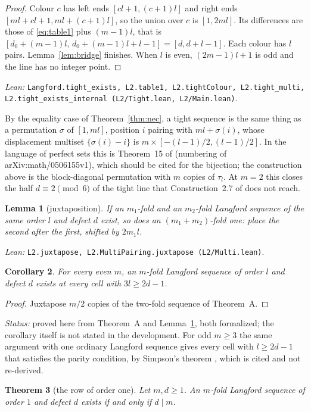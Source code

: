 \documentclass[11pt]{amsart}
\theoremstyle{plain}
\newtheorem{theorem}{Theorem}[section]
\newtheorem{lemma}[theorem]{Lemma}
\newtheorem{corollary}[theorem]{Corollary}
\theoremstyle{definition}
\theoremstyle{remark}
\newcommand{\lean}[1]{\par\smallskip
  {\small\raggedright\noindent\textit{Lean:} \texttt{#1}.\par}\smallskip}
\newcommand{\status}[1]{\par\smallskip
  {\small\raggedright\noindent\textit{Status:} #1\par}\smallskip}
\begin{document}
\begin{proof}
Colour $c$ has left ends $[cl+1,(c+1)l]$ and right ends $[ml+cl+1,ml+(c+1)l]$, so the
union over $c$ is $[1,2ml]$. Its differences are those of \eqref{eq:table1} plus
$(m-1)l$, that is $[d_0+(m-1)l,\, d_0+(m-1)l+l-1] = [d,d+l-1]$. Each colour has $l$
pairs. Lemma~\ref{lem:bridge} finishes. When $l$ is even, $(2m-1)l+1$ is odd and the line
has no integer point.
\end{proof}
\lean{Langford.tight\_exists, L2.table1, L2.tightColour, L2.tight\_multi,
L2.tight\_exists\_internal (L2/Tight.lean, L2/Main.lean)}

By the equality case of Theorem~\ref{thm:nec}, a tight sequence is the same thing as a
permutation $\sigma$ of $[1,ml]$, position $i$ pairing with $ml + \sigma(i)$, whose
displacement multiset $\{\sigma(i) - i\}$ is $m \times [-(l-1)/2,(l-1)/2]$. In the
language of perfect sets this is Theorem~15 of \cite{Nordh} (numbering of
arXiv:math/0506155v1), which should be cited for the bijection; the construction above
is the block-diagonal permutation with $m$ copies of $\tau_l$. At $m = 2$ this closes the
half $d \equiv 2 \pmod 6$ of the tight line that Construction~2.7 of \cite{ADH} does not
reach.

\begin{lemma}[juxtaposition]\label{lem:juxt}
If an $m_1$-fold and an $m_2$-fold Langford sequence of the same order $l$ and defect $d$
exist, so does an $(m_1+m_2)$-fold one: place the second after the first, shifted by
$2m_1l$.
\end{lemma}
\lean{L2.juxtapose, L2.MultiPairing.juxtapose (L2/Multi.lean)}

\begin{corollary}\label{cor:evenm}
For every even $m$, an $m$-fold Langford sequence of order $l$ and defect $d$ exists at
every cell with $3l \ge 2d-1$.
\end{corollary}

\begin{proof}
Juxtapose $m/2$ copies of the two-fold sequence of Theorem~A.
\end{proof}
\status{proved here from Theorem~A and Lemma~\ref{lem:juxt}, both formalized; the
corollary itself is not stated in the development. For odd $m \ge 3$ the same argument
with one ordinary Langford sequence gives every cell with $l \ge 2d-1$ that satisfies the
parity condition, by Simpson's theorem \cite{Simpson}, which is cited and not
re-derived.}

\begin{theorem}[the row of order one]\label{thm:orderone}
Let $m, d \ge 1$. An $m$-fold Langford sequence of order $1$ and defect $d$ exists if and
only if $d \mid m$.
\end{theorem}
\end{document}
